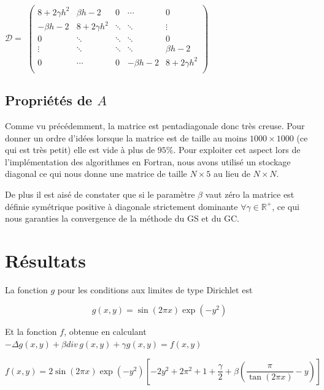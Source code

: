 \documentclass[twoside,12pt]{report}
\theoremstyle{remark}
\begin{document}
\begin{center}
$\mathcal{D}=$
$\begin{pmatrix}
8+2\gamma h^2 & \beta h -2 & 0 & \cdots & 0 \\
-\beta h -2 & 8+2\gamma h^2 & \ddots & \ddots & \vdots \\
0 & \ddots & \ddots & \ddots & 0 \\
\vdots & \ddots & \ddots & \ddots & \beta h -2\\
0 & \cdots & 0 & -\beta h -2 & 8+2\gamma h^2\\
\end{pmatrix}$
\end{center}

\section{Propriétés de \texorpdfstring{$A$}{A}}

Comme vu précédemment, la matrice est pentadiagonale donc très creuse. Pour donner un ordre d'idées lorsque la matrice est de taille au moins $1000\times 1000$ (ce qui est très petit) elle est vide à plus de $95\%$. Pour exploiter cet aspect lors de l'implémentation des algorithmes en Fortran, nous avons utilisé un stockage diagonal ce qui nous donne une matrice de taille $N\times 5$ au lieu de $N \times N$.

De plus il est aisé de constater que si le paramètre $\beta$ vaut zéro\label{betazero} la matrice est définie symétrique positive à diagonale strictement dominante $\forall \gamma \in \mathbb{R}^{+}$, ce qui nous garanties la convergence de la méthode du GS et du GC.

\chapter{Résultats}

La fonction $g$ pour les conditions aux limites de type Dirichlet est

\begin{equation*}
g(x,y)=\sin(2 \pi x) \exp(-y^2)
\end{equation*}

Et la fonction $f$, obtenue en calculant $-\Delta g(x,y) + \beta div\,g(x,y) + \gamma g(x,y)=f(x,y)$

\begin{equation*}
f(x,y)=2 \sin(2 \pi x) \exp(-y^2) \left[ -2 y^2 +2\pi^2 +1 +\dfrac{\gamma}{2} +\beta \left( \dfrac{\pi}{\tan(2 \pi x)} -y \right) \right]
\end{equation*}
\end{document}
